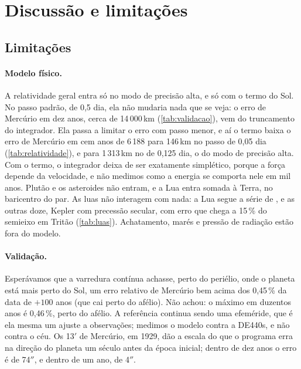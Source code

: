 \section{Discussão e limitações}\label{sec:discussao}

\subsection{Limitações}\label{cap:limitacoes}

\paragraph{Modelo físico.} A relatividade geral entra só no modo de precisão alta, e só com o termo do Sol. No passo padrão, de 0,5 dia, ela não mudaria nada que se veja: o erro de Mercúrio em dez anos, cerca de 14\,000\,km (\autoref{tab:validacao}), vem do truncamento do integrador. Ela passa a limitar o erro com passo menor, e aí o termo baixa o erro de Mercúrio em cem anos de 6\,188 para 146\,km no passo de 0,05 dia (\autoref{tab:relatividade}), e para 1\,313\,km no de 0,125 dia, o do modo de precisão alta. Com o termo, o integrador deixa de ser exatamente simplético, porque a força depende da velocidade, e não medimos como a energia se comporta nele em mil anos. Plutão e os asteroides não entram, e a Lua entra somada à Terra, no baricentro do par. As luas não interagem com nada: a Lua segue a série de , e as outras doze, Kepler com precessão secular, com erro que chega a 15\,\% do semieixo em Tritão (\autoref{tab:luas}). Achatamento, marés e pressão de radiação estão fora do modelo.

\paragraph{Validação.} Esperávamos que a varredura contínua achasse, perto do periélio, onde o planeta está mais perto do Sol, um erro relativo de Mercúrio bem acima dos 0,45\,\% da data de $+100$ anos (que cai perto do afélio). Não achou: o máximo em duzentos anos é 0,46\,\%, perto do afélio. A referência continua sendo uma efeméride, que é ela mesma um ajuste a observações; medimos o modelo contra a DE440s, e não contra o céu. Os 13$'$ de Mercúrio, em 1929, dão a escala do que o programa erra na direção do planeta um século antes da época inicial; dentro de dez anos o erro é de 74$''$, e dentro de um ano, de 4$''$.

